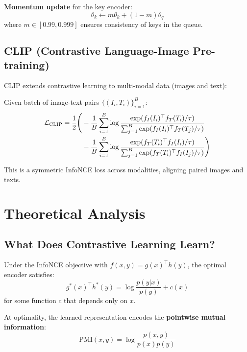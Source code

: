 \begin{notechapter}
\textbf{Momentum update} for the key encoder:
\begin{equation}
\theta_k \gets m \theta_k + (1-m) \theta_q
\end{equation}
where $m \in [0.99, 0.999]$ ensures consistency of keys in the queue.

\subsection{CLIP (Contrastive Language-Image Pre-training)}

CLIP extends contrastive learning to multi-modal data (images and text):

\begin{definition}
Given batch of image-text pairs $\{(I_i, T_i)\}_{i=1}^{B}$:
\begin{align}
\mathcal{L}_{\text{CLIP}} = \frac{1}{2}\Bigg(&-\frac{1}{B}\sum_{i=1}^{B} \log \frac{\exp(f_I(I_i)^\top f_T(T_i)/\tau)}{\sum_{j=1}^{B} \exp(f_I(I_i)^\top f_T(T_j)/\tau)} \\
&-\frac{1}{B}\sum_{i=1}^{B} \log \frac{\exp(f_T(T_i)^\top f_I(I_i)/\tau)}{\sum_{j=1}^{B} \exp(f_T(T_i)^\top f_I(I_j)/\tau)}\Bigg)
\end{align}
\end{definition}

This is a symmetric InfoNCE loss across modalities, aligning paired images and texts.

\section{Theoretical Analysis}

\subsection{What Does Contrastive Learning Learn?}

\begin{theorem}
Under the InfoNCE objective with $f(x,y) = g(x)^\top h(y)$, the optimal encoder satisfies:
\begin{equation}
g^*(x)^\top h^*(y) = \log \frac{p(y|x)}{p(y)} + c(x)
\end{equation}
for some function $c$ that depends only on $x$.
\end{theorem}

\begin{corollary}
At optimality, the learned representation encodes the \textbf{pointwise mutual information}:
\begin{equation}
\text{PMI}(x, y) = \log \frac{p(x, y)}{p(x)p(y)}
\end{equation}
\end{corollary}


\end{notechapter}
